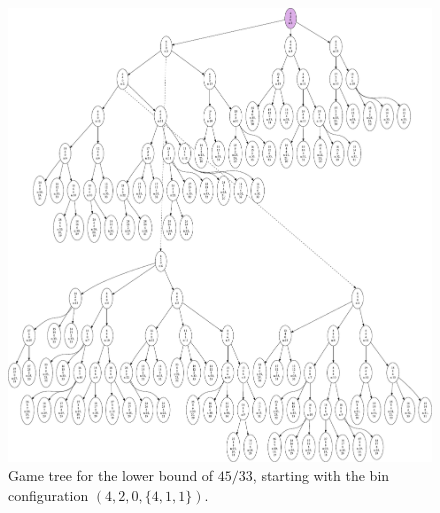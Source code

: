 \begin{figure}
  \includegraphics[scale=0.6]{img/4-2-0.pdf}
  \caption{Game tree for the lower bound of $45/33$, starting with the bin configuration $(4,2,0,\{4,1,1\})$.}
\end{figure}